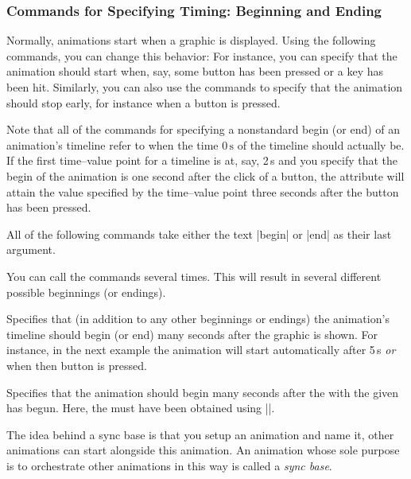 \subsubsection{Commands for Specifying Timing: Beginning and Ending}

Normally, animations start when a graphic is displayed. Using the
following commands, you can change this behavior: For instance, you
can specify that the animation should start when, say, some button has
been pressed or a key has been hit. Similarly, you can also use the
commands to specify that the animation should stop early, for instance
when a button is pressed.

Note that all of the commands for specifying a nonstandard begin (or
end) of an animation's timeline refer to when the time $0\,\mathrm s$
of the timeline should actually be. If the first time--value point for
a timeline is at, say, 2\,s and you specify that the begin of the
animation is one second after the click of a button, the attribute
will attain the value specified by the time--value point three seconds
after the button has been pressed.

All of the following commands take either the text |begin| or |end| as
their last argument.

You can call the commands several times. This will result in several
different possible beginnings (or endings).

\begin{command}{\pgfsys@animation@offset{}}
  Specifies that (in addition to any other beginnings or endings) the
  animation's timeline should begin (or end)  many
  seconds after the graphic is shown. For instance, in the next
  example the animation will start automatically after 5\,s \emph{or}
  when then button is pressed.
\begin{codeexample}[width=2cm]
\end{codeexample}
\end{command}

\begin{command}{\pgfsys@animation@syncbegin{}}
  Specifies that the animation should begin  many
  seconds after the  with the given  has
  begun. Here, the  must have been obtained using
  |\pgfsys@new@id|.

  The idea behind a sync base is that you setup an animation and name
  it, other animations can start alongside this animation. An
  animation whose sole purpose is to orchestrate other animations in
  this way is called a \emph{sync base}. 
\end{command}

